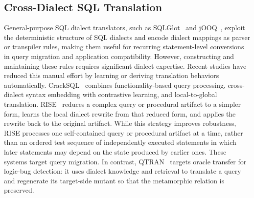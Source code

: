 \documentclass[conference]{IEEEtran}
\begin{document}



\subsection{Cross-Dialect SQL Translation}
General-purpose SQL dialect translators, such as SQLGlot~\cite{sqlglot} and jOOQ~\cite{jooq}, exploit the deterministic structure of SQL dialects and encode dialect mappings as parser or transpiler rules, making them useful for recurring statement-level conversions in query migration and application compatibility.
However, constructing and maintaining these rules requires significant dialect expertise.
Recent studies have reduced this manual effort by learning or deriving translation behaviors automatically.
CrackSQL~\cite{zhou2025cracking} combines functionality-based query processing, cross-dialect syntax embedding with contrastive learning, and local-to-global translation.
RISE~\cite{xie2026rise} reduces a complex query or procedural artifact to a simpler form, learns the local dialect rewrite from that reduced form, and applies the rewrite back to the original artifact.
While this strategy improves robustness, RISE processes one self-contained query or procedural artifact at a time, rather than an ordered test sequence of independently executed statements in which later statements may depend on the state produced by earlier ones.
These systems target query migration.
In contrast, QTRAN~\cite{lin2025qtran} targets oracle transfer for logic-bug detection: it uses dialect knowledge and retrieval to translate a query and regenerate its target-side mutant so that the metamorphic relation is preserved.
\end{document}
